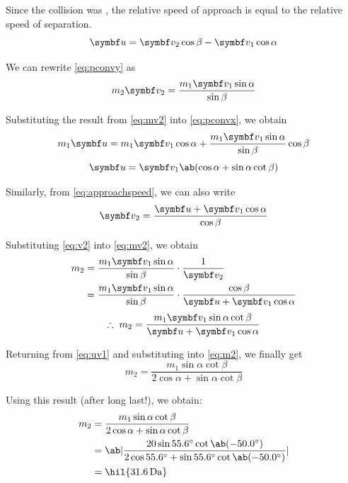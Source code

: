 Since the collision was , the relative speed of approach
is equal to the relative speed of separation.
\begin{equation}
  \mv{u} = \mv{v}_2 \cos \beta - \mv{v}_1 \cos \alpha
  \label{eq:approachspeed}
\end{equation}

We can rewrite \cref{eq:pconvy} as
\begin{equation}
  m_2\mv{v}_2 = \dfrac{m_1\mv{v}_1\sin\alpha}{\sin\beta}
  \label{eq:mv2}
\end{equation}

Substituting the result from \cref{eq:mv2} into \cref{eq:pconvx}, we obtain
\begin{align*}
  m_1\mv{u} &= m_1\mv{v}_1\cos\alpha +
  \dfrac{m_1\mv{v_1}\sin\alpha}{\sin\beta}\cos\beta \\
\end{align*}
\begin{equation}
  \mv{u} = \mv{v}_1\ab(\cos\alpha + \sin\alpha\cot\beta)
  \label{eq:uv1}
\end{equation}

Similarly, from \cref{eq:approachspeed}, we can also write
\begin{equation}
  \mv{v}_2 = \dfrac{\mv{u} + \mv{v}_1\cos\alpha}{\cos\beta}
  \label{eq:v2}
\end{equation}

Substituting \cref{eq:v2} into \cref{eq:mv2}, we obtain
\begin{align*}
  m_2 &= \dfrac{m_1\mv{v}_1\sin\alpha}{\sin\beta} \cdot \dfrac{1}{\mv{v}_2} \\
  &=
  \dfrac{m_1\mv{v}_1\sin\alpha}{\sin\beta}\cdot\dfrac{\cos\beta}{\mv{u}
  + \mv{v}_1\cos\alpha} \\
\end{align*}
\begin{equation}
  \therefore\; m_2
  =\dfrac{m_1\mv{v}_1\sin\alpha\cot\beta}{\mv{u}+\mv{v}_1\cos\alpha}
  \label{eq:m2}
\end{equation}

Returning from \cref{eq:uv1} and substituting into \cref{eq:m2}, we
finally get
\begin{equation}
  m_2 = \dfrac{m_1\sin\alpha\cot\beta}{2\cos\alpha + \sin\alpha\cot\beta}
\end{equation}

Using this result (after long last!), we obtain:
\begin{align*}
  m_2 &= \dfrac{m_1\sin\alpha\cot\beta}{2\cos\alpha + \sin\alpha\cot\beta} \\
  &=
  \ab|\frac{20\sin\qty{55.6}{\degree}\cot\ab(\qty{-50.0}{\degree})}{2\cos\qty{55.6}{\degree}
  + \sin\qty{55.6}{\degree}\cot\ab(\qty{-50.0}{\degree})}| \\
  &= \hil{\qty{31.6}{\dalton}}
\end{align*}

